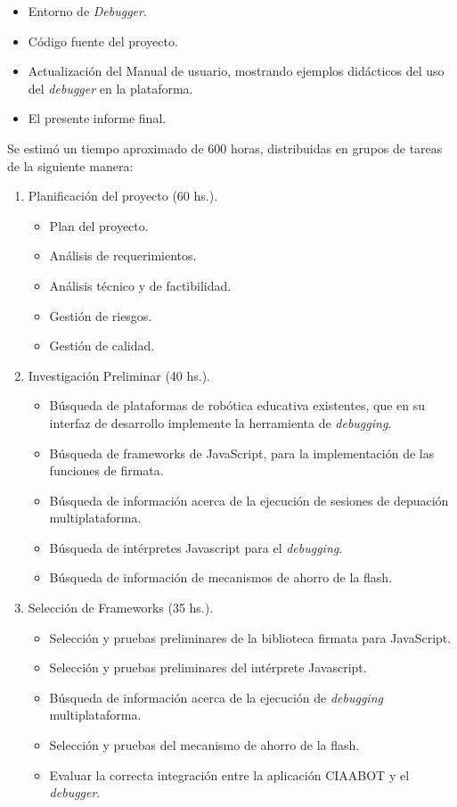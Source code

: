 \begin{itemize}
	\item Entorno de \emph{Debugger}.	
	\item Código fuente del proyecto.
	\item Actualización del Manual de usuario, mostrando ejemplos didácticos del uso del \emph{debugger} en la plataforma.
	\item El presente informe final.
\end{itemize}

Se estimó un tiempo aproximado de 600 horas, distribuidas en grupos de tareas de
la siguiente manera:

\begin{enumerate}
	\item Planificación del proyecto (60 hs.).
	
	\begin{itemize}
		\item Plan del proyecto.
		\item Análisis de requerimientos.
		\item Análisis técnico y de factibilidad.
		\item Gestión de riesgos.
		\item Gestión de calidad.
	\end{itemize}

	\item Investigación Preliminar (40 hs.).
	
	\begin{itemize}
		\item Búsqueda de plataformas de robótica educativa existentes, que en su interfaz de desarrollo implemente la herramienta de \emph{debugging}.
		\item Búsqueda de frameworks de JavaScript, para la implementación de las funciones de firmata.
		\item Búsqueda de información acerca de la ejecución de sesiones de depuación multiplataforma.
		\item Búsqueda de intérpretes Javascript para el \emph{debugging}.
		\item Búsqueda de información de mecanismos de ahorro de la flash.
	\end{itemize}

	\item Selección de Frameworks (35 hs.).
	
	\begin{itemize}
		\item Selección y pruebas preliminares de la biblioteca firmata para JavaScript.
		\item Selección y pruebas preliminares del intérprete Javascript.
		\item Búsqueda de información acerca de la ejecución de \emph{debugging} multiplataforma.
		\item Selección y pruebas del mecanismo de ahorro de la flash.
		\item Evaluar la correcta integración entre la aplicación CIAABOT y el \emph{debugger}.
	\end{itemize}
	

\end{enumerate}
